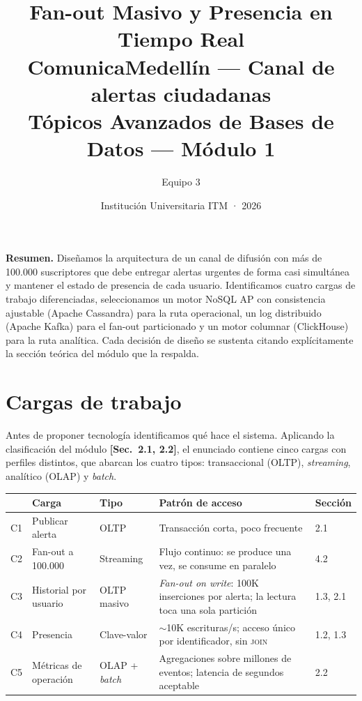 \documentclass[11pt,a4paper]{article}
\title{\vspace{-1.5cm}
  \textcolor{itmazul}{\Large\textbf{Fan-out Masivo y Presencia en Tiempo Real}}\\[4pt]
  \large ComunicaMedellín — Canal de alertas ciudadanas\\[10pt]
  \normalsize Tópicos Avanzados de Bases de Datos — Módulo 1}
\author{\normalsize Equipo 3}
\date{\normalsize Institución Universitaria ITM · 2026}
\newcommand{\sect}[1]{\textcolor{acento}{\textbf{[Sec.~#1]}}}
\begin{document}
\maketitle
\thispagestyle{fancy}

\begin{center}
\begin{minipage}{0.93\textwidth}\small
\textbf{Resumen.} Diseñamos la arquitectura de un canal de difusión con más de
100.000 suscriptores que debe entregar alertas urgentes de forma casi simultánea
y mantener el estado de presencia de cada usuario. Identificamos cuatro cargas de
trabajo diferenciadas, seleccionamos un motor NoSQL AP con consistencia ajustable
(Apache Cassandra) para la ruta operacional, un log distribuido (Apache Kafka)
para el fan-out particionado y un motor columnar (ClickHouse) para la ruta
analítica. Cada decisión de diseño se sustenta citando explícitamente la sección teórica
del módulo que la respalda.
\end{minipage}
\end{center}
\vspace{6pt}

\section{Cargas de trabajo}
Antes de proponer tecnología identificamos qué hace el sistema. Aplicando la
clasificación del módulo \sect{2.1, 2.2}, el enunciado contiene cinco cargas con
perfiles distintos, que abarcan los cuatro tipos: transaccional (OLTP),
\emph{streaming}, analítico (OLAP) y \emph{batch}.

\begin{center}\small
\begin{tabular}{@{}p{0.4cm}p{3.2cm}p{2.4cm}p{5.5cm}p{1.4cm}@{}}
\toprule
\textbf{} & \textbf{Carga} & \textbf{Tipo} & \textbf{Patrón de acceso} & \textbf{Sección} \\
\midrule
C1 & Publicar alerta & OLTP & Transacción corta, poco frecuente & 2.1 \\
C2 & Fan-out a 100.000 & Streaming & Flujo continuo: se produce una vez, se consume en paralelo & 4.2 \\
C3 & Historial por usuario & OLTP masivo & \emph{Fan-out on write}: 100K inserciones por alerta; la lectura toca una sola partición & 1.3, 2.1 \\
C4 & Presencia & Clave-valor & $\sim$10K escrituras/s; acceso único por identificador, sin \textsc{join} & 1.2, 1.3 \\
C5 & Métricas de operación & OLAP + \emph{batch} & Agregaciones sobre millones de eventos; latencia de segundos aceptable & 2.2 \\
\bottomrule
\end{tabular}
\end{center}
\end{document}
